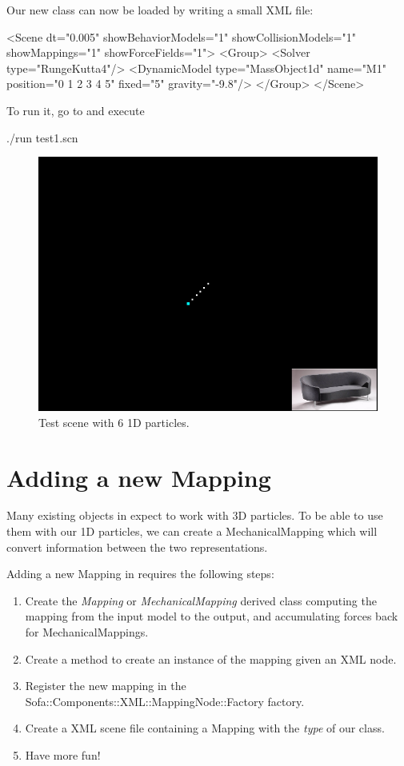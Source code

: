 Our new class can now be loaded by writing a small XML file:

\begin{code_xml}
<Scene dt="0.005" showBehaviorModels="1" showCollisionModels="1" showMappings="1" showForceFields="1">
	<Group>
		<Solver type="RungeKutta4"/>
		<DynamicModel type="MassObject1d" name="M1" position="0 1 2 3 4 5" fixed="5" gravity="-9.8"/>
	</Group>
</Scene>
\end{code_xml}

To run it, go to  and execute
\begin{code_bash}
./run test1.scn
\end{code_bash}

\begin{figure}
\centering
\includegraphics[width=0.5\linewidth]{fig/mass1d}
\caption{Test scene with 6 1D particles.}
\end{figure}

\section{Adding a new Mapping}

Many existing objects in \sofa{} expect to work with 3D particles. To be able to use them with our 1D particles, we can create a MechanicalMapping which will convert information between the two representations.

Adding a new Mapping in \sofa{} requires the following steps:

\begin{enumerate}
\item Create the \textit{Mapping} or \textit{MechanicalMapping} derived class computing the mapping from the input model to the output, and accumulating forces back for MechanicalMappings.
\item Create a method to create an instance of the mapping given an XML node.
\item Register the new mapping in the Sofa::Components::XML::MappingNode::Factory factory.
\item Create a XML scene file containing a Mapping with the \textit{type} of our class.
\item Have more fun!
\end{enumerate}

